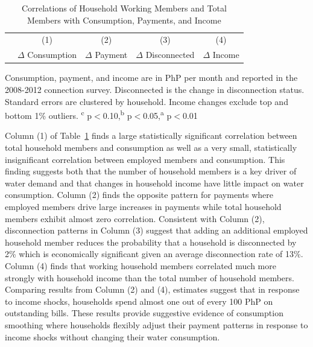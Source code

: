 \documentclass[12pt]{article}
\begin{document}
\begin{table}[!ht]
\small
\centering
\begin{threeparttable}
\caption{Correlations of Household Working Members and Total Members with Consumption, Payments, and Income}\label{table:panelanalysis}
\vspace{-2mm}
\begin{tabular}{lcccc}
\toprule
 & \small (1) & \small (2) & \small (3) & \small (4)  \\
 & \small $\Delta$ Consumption & \small $\Delta$ Payment  & \small $\Delta$ Disconnected & \small $\Delta$ Income \\[.5em]
 \toprule

\bottomrule
\end{tabular}
\begin{tablenotes}
\footnotesize
\item Consumption, payment, and income are in PhP per month and  reported in the 2008-2012 connection survey.  Disconnected is the change in disconnection status.  Standard errors are clustered by household.  Income changes exclude top and bottom 1\% outliers. \textsuperscript{c} p$<$0.10,\textsuperscript{b} p$<$0.05,\textsuperscript{a} p$<$0.01 
\end{tablenotes}
\end{threeparttable}
\end{table}

Column (1) of Table~\ref{table:panelanalysis} finds a large statistically significant correlation between total household members and consumption as well as a very small, statistically insignificant correlation between employed members and consumption.  This finding suggests both that the number of household members is a key driver of water demand and that changes in household income have little impact on water consumption.  Column (2) finds the opposite pattern for payments where employed members drive large increases in payments while total household members exhibit almost zero correlation.  Consistent with Column (2), disconnection patterns in Column (3) suggest that adding an additional employed household member reduces the probability that a household is disconnected by 2\% which is economically significant given an average disconnection rate of 13\%.  Column (4) finds that working household members correlated much more strongly with household income than the total number of household members.  Comparing results from Column (2) and (4), estimates suggest that in response to income shocks, households spend almost one out of every 100 PhP on outstanding bills.  These results provide suggestive evidence of consumption smoothing where households flexibly adjust their payment patterns in response to income shocks without changing their water consumption.  
\end{document}
